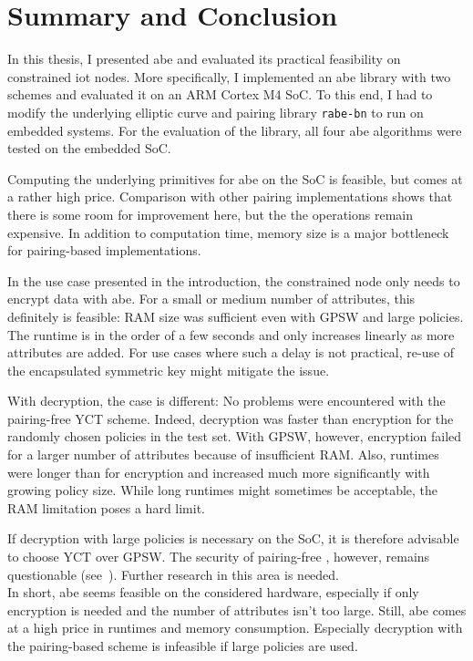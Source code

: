 \chapter{Summary and Conclusion}

In this thesis, I presented \acrshort{abe} and evaluated its practical feasibility on constrained \acrshort{iot} nodes.
More specifically, I implemented an \acrfull{abe} library with two schemes and evaluated it on an ARM Cortex M4 SoC.
To this end, I had to modify the underlying elliptic curve and pairing library \texttt{rabe-bn} to run on embedded systems.
For the evaluation of the library, all four \acrshort{abe} algorithms were tested on the embedded SoC.

Computing the underlying primitives for \acrshort{abe} on the SoC is feasible, but comes at a rather high price.
Comparison with other pairing implementations shows that there is some room for improvement here, but the the operations remain expensive.
In addition to computation time, memory size is a major bottleneck for pairing-based implementations.

In the use case presented in the introduction, the constrained node only needs to encrypt data with \acrshort{abe}.
For a small or medium number of attributes, this definitely is feasible:
RAM size was sufficient even with GPSW and large policies.
The runtime is in the order of a few seconds and only increases linearly as more attributes are added.
For use cases where such a delay is not practical, re-use of the encapsulated symmetric key might mitigate the issue.

With decryption, the case is different: 
No problems were encountered with the pairing-free YCT scheme.
Indeed, decryption was faster than encryption for the randomly chosen policies in the test set.
With GPSW, however, encryption failed for a larger number of attributes because of insufficient RAM.
Also, runtimes were longer than for encryption and increased much more significantly with growing policy size.
While long runtimes might sometimes be acceptable, the RAM limitation poses a hard limit.

If decryption with large policies is necessary on the SoC, it is therefore advisable to choose YCT over GPSW.
The security of pairing-free , however, remains questionable (see~\cite{herranz_attacking_2020}).
Further research in this area is needed.\\

In short, \acrfull{abe} seems feasible on the considered hardware, especially if only encryption is needed and the number of attributes isn't too large.
Still, \acrshort{abe} comes at a high price in runtimes and memory consumption.
Especially decryption with the pairing-based scheme is infeasible if large policies are used.